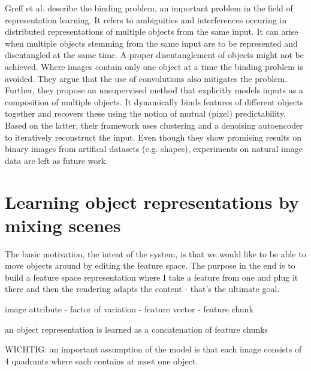 \documentclass[12pt,a4paper]{article}
\begin{document}

\par Greff et al. \cite{BindingRC} describe the binding problem, an important problem in the field of representation learning. It refers to ambiguities and interferences occuring in distributed representations of multiple objects from the same input. It can arise when multiple objects stemming from the same input are to be represented and disentangled at the same time. A proper disentanglement of objects might not be achieved. Where images contain only one object at a time the binding problem is avoided. They argue that the use of convolutions also mitigates the problem. Further, they propose an unsupervised method that explicitly models inputs as a composition of multiple objects. It dynamically binds features of different objects together and recovers these using the notion of mutual (pixel) predictability. Based on the latter, their framework uses clustering and a denoising autoencoder to iteratively reconstruct the input. Even though they show promising results on binary images from artifical datasets (e.g. shapes), experiments on natural image data are left as future work.


\section{Learning object representations by mixing scenes}
The basic motivation, the intent of the system, is that we would like to be able to move objects around by editing the feature space. The purpose in the end is to build a feature space representation where I take a feature from one and plug it there and then the rendering adapts the content - that's the ultimate goal.
\par image attribute - factor of variation - feature vector - feature chunk
\par an object representation is learned as a concatenation of feature chunks

\par WICHTIG: an important assumption of the model is that each image consists of 4 quadrants where each contains at most one object.
\end{document}
